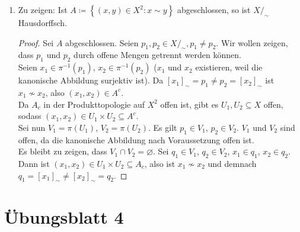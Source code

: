 \begin{solution}
\begin{enumerate}[label=(\alph*)]
    \item Zu zeigen: Ist \( A \coloneqq \left \{ (x,y) \in X^2 : x \sim y \right \} \) abgeschlossen, so ist \( X/_\sim \) Hausdorffsch.
    \begin{proof}
      Sei \( A \) abgeschlossen. Seien \( p_1, p_2 \in X/_\sim, p_1 \neq p_2 \). Wir wollen zeigen, dass \( p_1 \) und \( p_2 \) durch offene Mengen getrennt werden können. \\
      Seien \( x_1 \in \pi^{-1}(p_1) \), \( x_2 \in \pi^{-1}(p_2) \) (\( x_1 \) und \( x_2 \) existieren, weil die kanonische Abbildung surjektiv ist). Da \( {[x_1]}_\sim = p_1 \neq p_2 = {[x_2]}_\sim \) ist \( x_1 \not \sim x_2 \), also \( (x_1, x_2) \in A^c \). \\
      Da \( A_c \) in der Produkttopologie auf \( X^2 \) offen ist, gibt es \( U_1, U_2 \subseteq X \) offen, sodass \( (x_1, x_2) \in U_1 \times U_2 \subseteq A^c \). \\
      Sei nun \( V_1 = \pi(U_1) \), \( V_2 = \pi(U_2) \). Es gilt \( p_1 \in V_1 \), \( p_2 \in V_2 \). \( V_1 \) und \( V_2 \) sind offen, da die kanonische Abbildung nach Voraussetzung offen ist. \\
      Es bleibt zu zeigen, dass \( V_1 \cap V_2 = \varnothing \). Sei \( q_1 \in V_1 \), \( q_2 \in V_2 \), \( x_1 \in q_1 \), \( x_2 \in q_2 \). Dann ist \( (x_1, x_2) \in U_1 \times U_2 \subseteq A_c \), also ist \( x_1 \not \sim x_2 \) und demnach \( q_1 = {[x_1]}_\sim \neq {[x_2]}_\sim = q_2 \).
    \end{proof}
  \end{enumerate}
\end{solution}



% 
\newpage
\setcounter{problemcounter}{0}
\section{Übungsblatt 4}

